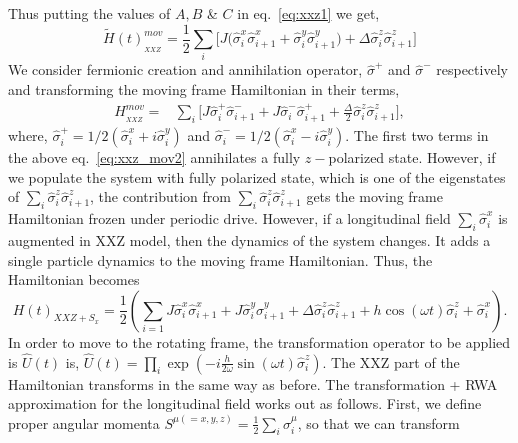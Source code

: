 \documentclass[aps,prb,reprint,showpacs,floatfix,superscriptaddress, onecolumn, nofootinbib, 9pt]{revtex4-2}
\begin{document}
\begin{enumerate}
{			Thus putting the values of $A, B$ \& $C$ in eq.~\eqref{eq:xxz1} we get,
			\begin{equation}
			\tilde{H}(t)_{_{XXZ}}^{mov} = \frac12\sum_i\bigg[J\big(\hat{\sigma}^x_i\hat{\sigma}^x_{i+1} + \hat{\sigma}^y_i\hat{\sigma}^y_{i+1}\big) + \Delta\hat{\sigma}^z_i\hat{\sigma}^z_{i+1}\bigg]
			\label{eq:xxz_mov1}
			\end{equation}
		 We consider fermionic creation and annihilation operator, $\hat{\sigma}^+$ and $\hat{\sigma}^-$ respectively and transforming the moving frame Hamiltonian in their terms,
		\begin{align}
			H_{_{XXZ}}^{mov} =& \sum_i\Bigg[J\hat{\sigma}^+_i \hat{\sigma}^-_{i+1} + J\hat{\sigma}^-_i \hat{\sigma}^+_{i+1} + \frac{\Delta}{2} \hat{\sigma}^z_i \hat{\sigma}^z_{i+1}\Bigg],
			\label{eq:xxz_mov2}
		\end{align} 
		where, $\hat{\sigma}^+_i = 1/2(\hat{\sigma}^x_i + i\hat{\sigma}^y_i)$ and $\hat{\sigma}^-_i = 1/2(\hat{\sigma}^x_i - i\hat{\sigma}^y_i)$. The first two terms in the above eq.~\eqref{eq:xxz_mov2} annihilates a fully $z-$polarized state. However, if we populate the system with fully polarized state, which is one of the eigenstates of $\displaystyle \sum_i \hat{\sigma}^z_i \hat{\sigma}^z_{i+1}$, the contribution from $\displaystyle \sum_i \hat{\sigma}^z_i \hat{\sigma}^z_{i+1}$ gets the moving frame Hamiltonian frozen under periodic drive. However, if a longitudinal field $\sum_i \hat{\sigma}^x_i$ is augmented in XXZ model, then the dynamics of the system changes. It adds a single particle dynamics to the moving frame Hamiltonian. Thus, the Hamiltonian becomes
			\begin{equation*}
				H(t)_{XXZ + S_x} = \frac12 \left( \sum_{i=1} J \hat{\sigma}^x_i \hat{\sigma}^x_{i+1} +J  \hat{\sigma}^y_i \hat{\sigma}^y_{i+1} + \Delta \hat{\sigma}^z_i \hat{\sigma}^z_{i+1} + h\cos(\omega t) \hat{\sigma}^z_i + \hat{\sigma}^x_i\right).
				\label{eq:xxz_sx}
			\end{equation*}
			In order to move to the rotating frame, the transformation operator to be applied is $\displaystyle \hat{U}(t)$ is, $\hat{U}(t)=\prod_{i} \exp \left(-i \frac{h}{2 \omega} \sin (\omega t) \hat{\sigma}_{i}^{z}\right)$. The XXZ part of the Hamiltonian transforms in the same way as before.	The transformation + RWA approximation for the longitudinal field works out as follows. First, we define proper angular momenta $\displaystyle S^{\mu(=x,y,z)} = \frac12\sum_i \hat{\sigma}^\mu_i$, so that we can transform
			\begin{align*}

\end{align*}}
\end{enumerate}
\end{document}
